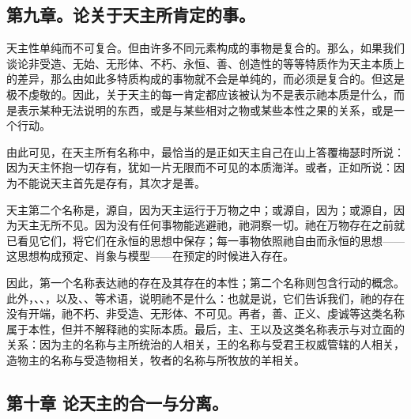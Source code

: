 
\subsection{第九章。论关于天主所肯定的事。}

天主性单纯而不可复合。但由许多不同元素构成的事物是复合的。那么，如果我们谈论非受造、无始、无形体、不朽、永恒、善、创造性的等等特质作为天主本质上的差异，那么由如此多特质构成的事物就不会是单纯的，而必须是复合的。但这是极不虔敬的。因此，关于天主的每一肯定都应该被认为不是表示祂本质是什么，而是表示某种无法说明的东西，或是与某些相对之物或某些本性之果的关系，或是一个行动。\par

由此可见，在天主所有名称中，最恰当的是正如天主自己在山上答覆梅瑟时所说：因为天主怀抱一切存有，犹如一片无限而不可见的本质海洋。或者，正如所说：因为不能说天主首先是存有，其次才是善。\par

天主第二个名称是，源自，因为天主运行于万物之中；或源自，因为；或源自，因为天主无所不见。因为没有任何事物能逃避祂，祂洞察一切。祂在万物存在之前就已看见它们，将它们在永恒的思想中保存；每一事物依照祂自由而永恒的思想——这思想构成预定、肖象与模型——在预定的时候进入存在。\par

因此，第一个名称表达祂的存在及其存在的本性；第二个名称则包含行动的概念。此外，、、，以及、、等术语，说明祂不是什么：也就是说，它们告诉我们，祂的存在没有开端，祂不朽、非受造、无形体、不可见。再者，善、正义、虔诚等这类名称属于本性，但并不解释祂的实际本质。最后，主、王以及这类名称表示与对立面的关系：因为主的名称与主所统治的人相关，王的名称与受君王权威管辖的人相关，造物主的名称与受造物相关，牧者的名称与所牧放的羊相关。\par


\subsection{第十章 论天主的合一与分离。}

